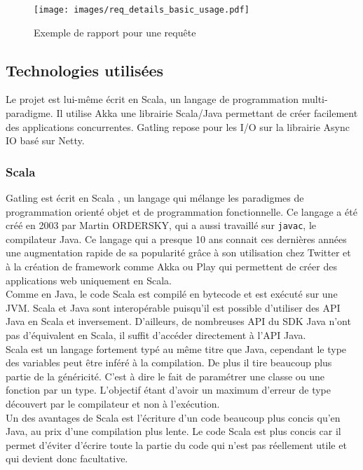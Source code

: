 \begin{figure}
 \centering
 \texttt{[image: images/req\_details\_basic\_usage.pdf]}
 \caption{Exemple de rapport pour une requête}
\end{figure}

\subsection{Technologies utilisées}

Le projet est lui-même écrit en Scala, un langage de programmation multi-paradigme. Il utilise Akka une librairie Scala/Java permettant de créer facilement des applications concurrentes. Gatling repose pour les I/O sur la librairie Async IO basé sur Netty.

\subsubsection{Scala}

Gatling est écrit en Scala \cite{scala}, un langage qui mélange les paradigmes de programmation orienté objet et de programmation fonctionnelle. Ce langage a été créé en 2003 par Martin ORDERSKY, qui a aussi travaillé sur \verb+javac+, le compilateur Java. Ce langage qui a presque 10 ans connait ces dernières années une augmentation rapide de sa popularité grâce à son utilisation chez Twitter et à la création de framework comme Akka ou Play \cite{play} qui permettent de créer des applications web uniquement en Scala.\\

Comme en Java, le code Scala est compilé en bytecode et est exécuté sur une JVM. Scala et Java sont interopérable puisqu'il est possible d'utiliser des API Java en Scala et inversement. D'ailleurs, de nombreuses API du SDK Java n'ont pas d'équivalent en Scala, il suffit d'accéder directement à l'API Java.\\

Scala est un langage fortement typé au même titre que Java, cependant le type des variables peut être inféré à la compilation. De plus il tire beaucoup plus partie de la généricité. C'est à dire le fait de paramétrer une classe ou une fonction par un type. L'objectif étant d'avoir un maximum d'erreur de type découvert par le compilateur et non à l'exécution.\\

Un des avantages de Scala est l'écriture d'un code beaucoup plus concis qu'en Java, au prix d'une compilation plus lente. Le code Scala est plus concis car il permet d'éviter d'écrire toute la partie du code qui n'est pas réellement utile et qui devient donc facultative.\\

